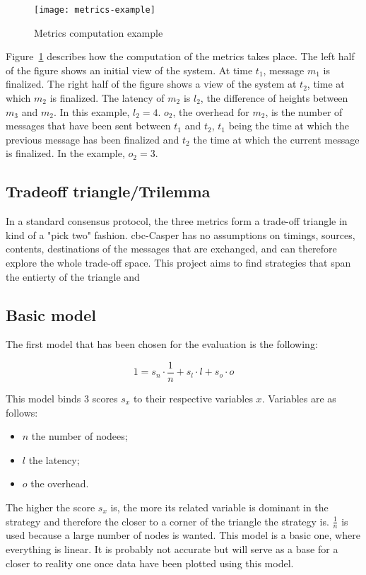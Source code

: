 \begin{figure}[H]
	\centering
	\texttt{[image: metrics-example]}
  \captionsetup{justification=centering}
    \caption{Metrics computation example}
	\label{fig:metricsSchema}
\end{figure}

Figure~\ref{fig:metricsSchema} describes how the computation of the metrics
takes place. The left half of the figure shows an initial view of the system. At
time \(t_1\), message \(m_1\) is finalized. The right half of the figure shows a
view of the system at \(t_2\), time at which \(m_2\) is finalized. The latency
of \(m_2\) is \(l_2\), the difference of heights between \(m_3\) and \(m_2\). In
this example, \(l_2 = 4\). \(o_2\), the overhead for \(m_2\), is the number of
messages that have been sent between \(t_1\) and \(t_2\), \(t_1\) being the time
at which the previous message has been finalized and \(t_2\) the time at which
the current message is finalized. In the example, \(o_2 = 3\).

\subsection{Tradeoff triangle/Trilemma}
In a standard consensus protocol, the three metrics form a trade-off triangle in
kind of a "pick two" fashion.  \gls{cbc}-Casper has no
assumptions on timings, sources, contents, destinations of the messages that are
exchanged, and can therefore explore the whole trade-off space. This project
aims to find strategies that span the entierty of the triangle and 

\subsection{Basic model}
\label{ssec:model}
The first model that has been chosen for the evaluation is the following:

\[1 = s_n \cdot \frac{1}{n} + s_l\cdot l + s_o\cdot o\]

This model binds 3 scores \(s_x\) to their respective variables \(x\).
Variables are as follows:
\begin{itemize}
    \item \(n\) the number of nodees;
    \item \(l\) the latency;
    \item \(o\) the overhead.
\end{itemize}
The higher the score \(s_x\) is, the more its related variable is dominant
in the strategy and therefore the closer to a corner of the triangle the strategy is.
\(\frac{1}{n}\) is used because a large number of nodes is wanted.
This model is a basic one, where everything is linear. It is probably not accurate but
will serve as a base for a closer to reality one once data have been plotted using
this model.

